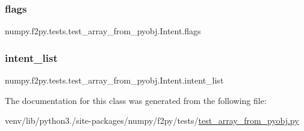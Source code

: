 \subsubsection{\texorpdfstring{flags}{flags}}
{\footnotesize\ttfamily numpy.\+f2py.\+tests.\+test\+\_\+array\+\_\+from\+\_\+pyobj.\+Intent.\+flags}

\mbox{\label{classnumpy_1_1f2py_1_1tests_1_1test__array__from__pyobj_1_1Intent_ad29ce970d99d274f38b23af9713feb8d}} 
\subsubsection{\texorpdfstring{intent\+\_\+list}{intent\_list}}
{\footnotesize\ttfamily numpy.\+f2py.\+tests.\+test\+\_\+array\+\_\+from\+\_\+pyobj.\+Intent.\+intent\+\_\+list}



The documentation for this class was generated from the following file\+:\begin{DoxyCompactItemize}
\item 
venv/lib/python3./site-\/packages/numpy/f2py/tests/\hyperlink{test__array__from__pyobj_8py}{test\+\_\+array\+\_\+from\+\_\+pyobj.\+py}\end{DoxyCompactItemize}
